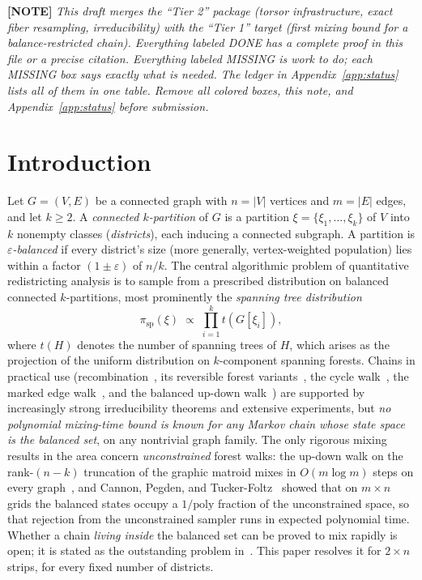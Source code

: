 \documentclass[11pt]{article}
\newcommand{\statusnote}[1]{\medskip\noindent\textcolor{notecol}{\textbf{[NOTE]} \emph{#1}}\medskip}
\begin{document}
\statusnote{This draft merges the ``Tier 2'' package (torsor infrastructure,
exact fiber resampling, irreducibility) with the ``Tier 1'' target (first
mixing bound for a balance-restricted chain). Everything labeled DONE has a
complete proof in this file or a precise citation. Everything labeled
MISSING is work to do; each MISSING box says exactly what is needed. The
ledger in Appendix~\ref{app:status} lists all of them in one table. Remove
all colored boxes, this note, and Appendix~\ref{app:status} before
submission.}

\tableofcontents

\section{Introduction}

Let $G = (V, E)$ be a connected graph with $n = |V|$ vertices and $m = |E|$
edges, and let $k \ge 2$. A \emph{connected $k$-partition} of $G$ is a
partition $\xi = \{\xi_1, \ldots, \xi_k\}$ of $V$ into $k$ nonempty classes
(\emph{districts}), each inducing a connected subgraph. A partition is
\emph{$\varepsilon$-balanced} if every district's size (more generally,
vertex-weighted population) lies within a factor $(1 \pm \varepsilon)$ of
$n/k$. The central algorithmic problem of quantitative redistricting analysis
is to sample from a prescribed distribution on balanced connected
$k$-partitions, most prominently the \emph{spanning tree distribution}
\[
  \pi_{\mathrm{sp}}(\xi) \;\propto\; \prod_{i=1}^{k} t(G[\xi_i]),
\]
where $t(H)$ denotes the number of spanning trees of $H$, which arises as the
projection of the uniform distribution on $k$-component spanning forests.
Chains in practical use (recombination~\cite{deford2021recom}, its
reversible forest variants~\cite{autry2020multiscale, charikar2023complexity},
the cycle walk~\cite{deford2025cycle}, the marked edge walk~\cite{mew}, and
the balanced up-down walk~\cite{akitaya2026bud}) are supported by
increasingly strong irreducibility theorems and extensive experiments, but
\emph{no polynomial mixing-time bound is known for any Markov chain whose
state space is the balanced set}, on any nontrivial graph family. The only
rigorous mixing results in the area concern \emph{unconstrained} forest
walks: the up-down walk on the rank-$(n-k)$ truncation of the graphic matroid
mixes in $O(m \log m)$ steps on every
graph~\cite{anari2021logconcave}, and Cannon, Pegden, and
Tucker-Foltz~\cite{cannon2024balanced} showed that on $m \times n$ grids the
balanced states occupy a $1/\mathrm{poly}$ fraction of the unconstrained
space, so that rejection from the unconstrained sampler runs in expected
polynomial time. Whether a chain \emph{living inside} the balanced set can be
proved to mix rapidly is open; it is stated as the outstanding problem
in~\cite{deford2025cycle, akitaya2026bud, cannon2024balanced}. This paper
resolves it for $2 \times n$ strips, for every fixed number of
districts.
\end{document}
